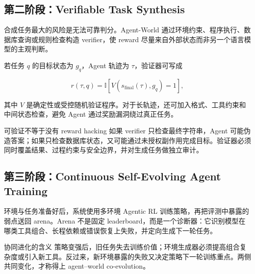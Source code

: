 \subsection{第二阶段：Verifiable Task Synthesis}

合成任务最大的风险是无法可靠判分。Agent-World 通过环境约束、程序执行、数据库查询或规则检查构造 verifier，使 reward 尽量来自外部状态而非另一个语言模型的主观判断。


若任务 $q$ 的目标状态为 $g_q$，Agent 轨迹为 $\tau$，验证器可写成

$$
r(\tau,q)=\mathbb{I}\!\left[V\!\left(s_{\mathrm{final}}(\tau),g_q\right)=1\right],
$$

其中 $V$ 是确定性或受控随机验证程序。对于长轨迹，还可加入格式、工具约束和中间状态检查，避免 Agent 通过奖励漏洞绕过真正任务。

\begin{warningbox}{可验证不等于没有 reward hacking}
如果 verifier 只检查最终字符串，Agent 可能伪造答案；如果只检查数据库状态，又可能通过未授权副作用完成目标。验证器必须同时覆盖结果、过程约束与安全边界，并对生成任务做独立审计。
\end{warningbox}

\subsection{第三阶段：Continuous Self-Evolving Agent Training}

环境与任务准备好后，系统使用多环境 Agentic RL 训练策略，再把评测中暴露的弱点送回 arena。Arena 不是固定 leaderboard，而是一个诊断器：它识别模型在哪类工具组合、长程依赖或错误恢复上失败，并定向生成下一轮任务。



\begin{importantbox}{协同进化的含义}
策略变强后，旧任务失去训练价值；环境生成器必须提高组合复杂度或引入新工具。反过来，新环境暴露的失败又决定策略下一轮训练重点。两侧共同变化，才称得上 agent--world co-evolution。
\end{importantbox}

